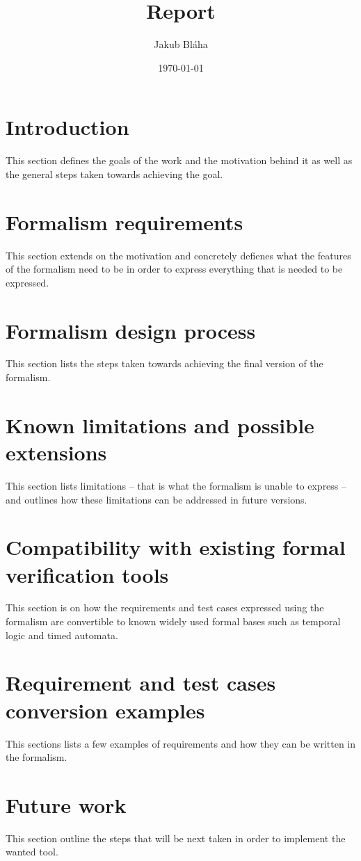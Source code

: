 \documentclass[a4paper,12pt]{article}
\title{Report}
\author{Jakub Bláha}
\date{\today}
\begin{document}
\maketitle
\tableofcontents
\newpage

\section{Introduction}

This section defines the goals of the work and the motivation behind it as well as the general steps taken towards achieving the goal.

\section{Formalism requirements}

This section extends on the motivation and concretely defienes what the features of the formalism need to be in order to express everything that is needed to be expressed.

\section{Formalism design process}

This section lists the steps taken towards achieving the final version of the formalism.

\section{Known limitations and possible extensions}

This section lists limitations -- that is what the formalism is unable to express -- and outlines how these limitations can be addressed in future versions.

\section{Compatibility with existing formal verification tools}

This section is on how the requirements and test cases expressed using the formalism are convertible to known widely used formal bases such as temporal logic and timed automata.

\section{Requirement and test cases conversion examples}

This sections lists a few examples of requirements and how they can be written in the formalism.

\section{Future work}

This section outline the steps that will be next taken in order to implement the wanted tool.
\end{document}
